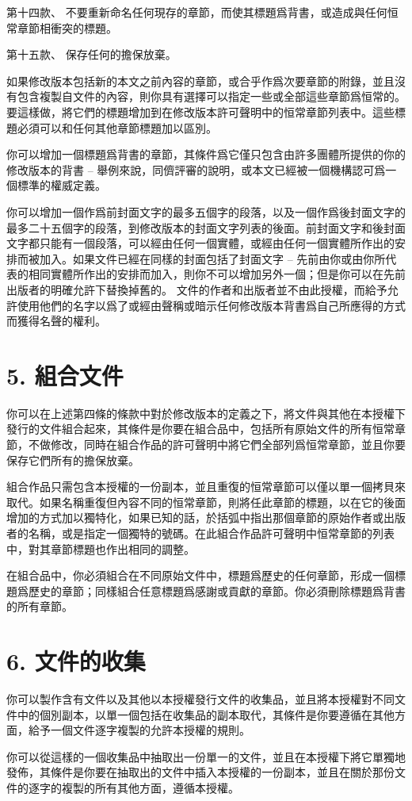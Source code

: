 第十四款、 不要重新命名任何現存的章節，而使其標題爲背書，或造成與任何恒常章節相衝突的標題。\par
第十五款、 保存任何的擔保放棄。\par
如果修改版本包括新的本文之前內容的章節，或合乎作爲次要章節的附錄，並且沒有包含複製自文件的內容，則你具有選擇可以指定一些或全部這些章節爲恒常的。要這樣做，將它們的標題增加到在修改版本許可聲明中的恒常章節列表中。這些標題必須可以和任何其他章節標題加以區別。\par
你可以增加一個標題爲背書的章節，其條件爲它僅只包含由許多團體所提供的你的修改版本的背書 -- 舉例來說，同儕評審的說明，或本文已經被一個機構認可爲一個標準的權威定義。\par
你可以增加一個作爲前封面文字的最多五個字的段落，以及一個作爲後封面文字的最多二十五個字的段落，到修改版本的封面文字列表的後面。前封面文字和後封面文字都只能有一個段落，可以經由任何一個實體，或經由任何一個實體所作出的安排而被加入。如果文件已經在同樣的封面包括了封面文字 -- 先前由你或由你所代表的相同實體所作出的安排而加入，則你不可以增加另外一個；但是你可以在先前出版者的明確允許下替換掉舊的。
文件的作者和出版者並不由此授權，而給予允許使用他們的名字以爲了或經由聲稱或暗示任何修改版本背書爲自己所應得的方式而獲得名聲的權利。
\section{5. 組合文件}
你可以在上述第四條的條款中對於修改版本的定義之下，將文件與其他在本授權下發行的文件組合起來，其條件是你要在組合品中，包括所有原始文件的所有恒常章節，不做修改，同時在組合作品的許可聲明中將它們全部列爲恒常章節，並且你要保存它們所有的擔保放棄。\par
組合作品只需包含本授權的一份副本，並且重復的恒常章節可以僅以單一個拷貝來取代。如果名稱重復但內容不同的恒常章節，則將任此章節的標題，以在它的後面增加的方式加以獨特化，如果已知的話，於括弧中指出那個章節的原始作者或出版者的名稱，或是指定一個獨特的號碼。在此組合作品許可聲明中恒常章節的列表中，對其章節標題也作出相同的調整。\par
在組合品中，你必須組合在不同原始文件中，標題爲歷史的任何章節，形成一個標題爲歷史的章節；同樣組合任意標題爲感謝或貢獻的章節。你必須刪除標題爲背書的所有章節。
\section{6. 文件的收集}
你可以製作含有文件以及其他以本授權發行文件的收集品，並且將本授權對不同文件中的個別副本，以單一個包括在收集品的副本取代，其條件是你要遵循在其他方面，給予一個文件逐字複製的允許本授權的規則。\par
你可以從這樣的一個收集品中抽取出一份單一的文件，並且在本授權下將它單獨地發佈，其條件是你要在抽取出的文件中插入本授權的一份副本，並且在關於那份文件的逐字的複製的所有其他方面，遵循本授權。
